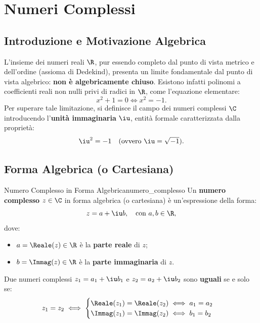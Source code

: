 
\chapter{Numeri Complessi}
\label{chap:numeri_complessi}

\section{Introduzione e Motivazione Algebrica}
L'insieme dei numeri reali $\R$, pur essendo completo dal punto di vista metrico e dell'ordine (assioma di Dedekind), presenta un limite fondamentale dal punto di vista algebrico: \textbf{non è algebricamente chiuso}. Esistono infatti polinomi a coefficienti reali non nulli privi di radici in $\R$, come l'equazione elementare:
\begin{equation}
    x^2 + 1 = 0 \iff x^2 = -1.
\end{equation}
Per superare tale limitazione, si definisce il campo dei numeri complessi $\C$ introducendo l'\textbf{unità immaginaria} $\iu$, entità formale caratterizzata dalla proprietà:
\begin{equation}
    \iu^2 = -1 \quad (\text{ovvero } \iu = \sqrt{-1}).
\end{equation}

\section{Forma Algebrica (o Cartesiana)}

\begin{definizione}{Numero Complesso in Forma Algebrica}{numero_complesso}
Un \textbf{numero complesso} $z \in \C$ in forma algebrica (o cartesiana) è un'espressione della forma:
\begin{equation}
    z = a + \iu b, \quad \text{con } a, b \in \R,
\end{equation}
dove:
\begin{itemize}
    \item $a = \Reale(z) \in \R$ è la \textbf{parte reale} di $z$;
    \item $b = \Immag(z) \in \R$ è la \textbf{parte immaginaria} di $z$.
\end{itemize}
Due numeri complessi $z_1 = a_1 + \iu b_1$ e $z_2 = a_2 + \iu b_2$ sono \textbf{uguali} se e solo se:
\begin{equation}
    z_1 = z_2 \iff \begin{cases} \Reale(z_1) = \Reale(z_2) \iff a_1 = a_2 \\ \Immag(z_1) = \Immag(z_2) \iff b_1 = b_2 \end{cases}
\end{equation}
\end{definizione}

